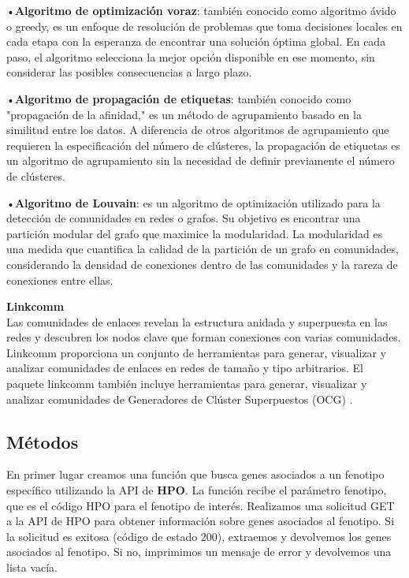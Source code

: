 •\textbf{Algoritmo de optimización voraz}: también conocido como algoritmo ávido o greedy, es un enfoque de resolución de problemas que toma decisiones locales en cada etapa con la esperanza de encontrar una solución óptima global. En cada paso, el algoritmo selecciona la mejor opción disponible en ese momento, sin considerar las posibles consecuencias a largo plazo.

•\textbf{Algoritmo de propagación de etiquetas}: también conocido como "propagación de la afinidad," es un método de agrupamiento basado en la similitud entre los datos. A diferencia de otros algoritmos de agrupamiento que requieren la especificación del número de clústeres, la propagación de etiquetas es un algoritmo de agrupamiento sin la necesidad de definir previamente el número de clústeres.

•\textbf{Algoritmo de Louvain}: es un algoritmo de optimización utilizado para la detección de comunidades en redes o grafos. Su objetivo es encontrar una partición modular del grafo que maximice la modularidad. La modularidad es una medida que cuantifica la calidad de la partición de un grafo en comunidades, considerando la densidad de conexiones dentro de las comunidades y la rareza de conexiones entre ellas.

\vspace{3pt}

\textbf{Linkcomm}\\
Las comunidades de enlaces revelan la estructura anidada y superpuesta en las redes y descubren los nodos clave que forman conexiones con varias comunidades. Linkcomm proporciona un conjunto de herramientas para generar, visualizar y analizar comunidades de enlaces en redes de tamaño y tipo arbitrarios. El paquete linkcomm también incluye herramientas para generar, visualizar y analizar comunidades de Generadores de Clúster Superpuestos (OCG) \cite{Kalinka2011}.


\subsection{Métodos}
En primer lugar creamos una función que busca genes asociados a un fenotipo específico utilizando la API de \textbf{HPO}.
La función recibe el parámetro fenotipo, que es el código HPO para el fenotipo de interés.
Realizamos una solicitud GET a la API de HPO para obtener información sobre genes asociados al fenotipo.
Si la solicitud es exitosa (código de estado 200), extraemos y devolvemos los genes asociados al fenotipo. Si no, imprimimos un mensaje de error y devolvemos una lista vacía.



